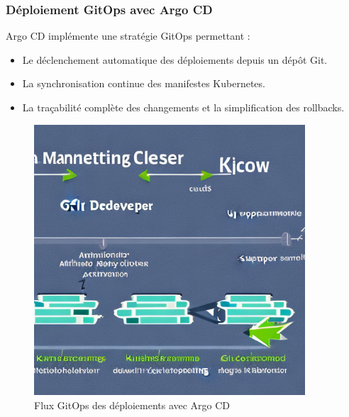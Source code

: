 \subsubsection*{Déploiement GitOps avec Argo CD}

Argo CD implémente une stratégie GitOps permettant :
\begin{itemize}
	\item Le déclenchement automatique des déploiements depuis un dépôt Git.
	\item La synchronisation continue des manifestes Kubernetes.
	\item La traçabilité complète des changements et la simplification des rollbacks.
\end{itemize}

\begin{figure}[H]
	\centering
	\includegraphics[width=0.9\textwidth]{figures/gitops-argo-cd.png}
	\caption{Flux GitOps des déploiements avec Argo CD}
\end{figure}

